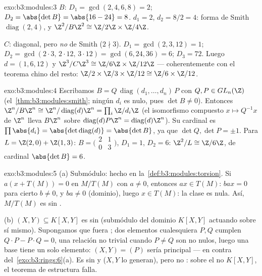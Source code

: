 \begin{solution}{exo:b3:modules:3}
$B$: $D_1 = \gcd(2,4,6,8) = 2$; $D_2 = \abs{\det B} = \abs{16 -
24} = 8$.  $d_1 = 2$,
$d_2 = 8/2 = 4$: forma de Smith $\operatorname{diag}(2, 4)$, y
$\Z^2/B\Z^2 \cong \Z/2\Z
\times \Z/4\Z$.

$C$: diagonal, pero \emph{no} de Smith ($2 \nmid 3$). $D_1 =
\gcd(2,3,12) = 1$; $D_2 = \gcd(2\cdot3,\, 2\cdot12,\, 3\cdot12) =
\gcd(6, 24, 36) = 6$; $D_3 = 72$. Luego $d = (1, 6, 12)$ y
$\Z^3/C\Z^3 \cong \Z/6\Z\times\Z/12\Z$ --- coherentemente con el teorema
chino del resto: $\Z/2\times\Z/3\times\Z/12 \cong \Z/6\times\Z/12$.
\end{solution}

\begin{solution}{exo:b3:modules:4}
Escribamos $B = Q\,\operatorname{diag}(d_1, \dots, d_n)\,P$ con $Q, P
\in GL_n(\Z)$ (el~\cref{thm:b3:modules:smith}; ningún $d_i$ es nulo,
pues $\det B \neq 0$). Entonces $\Z^n/B\Z^n \cong \Z^n/
\operatorname{diag}(d)\Z^n = \prod_i \Z/d_i\Z$ (el isomorfismo compuesto
$x \mapsto Q^{-1}x$ de $\Z^n$ lleva $B\Z^n$ sobre
$\operatorname{diag}(d)P\Z^n = \operatorname{diag}(d)\Z^n$). Su cardinal
es $\prod \abs{d_i} = \abs{\det
\operatorname{diag}(d)} = \abs{\det B}$, ya que $\det Q, \det P = \pm
1$. Para $L = \Z(2,0) + \Z(1,3)$: $B = \bigl(\begin{smallmatrix}2
& 1\\ 0 & 3\end{smallmatrix}\bigr)$, $D_1 = 1$, $D_2 = 6$: $\Z^2/L
\cong \Z/6\Z$, de cardinal $\abs{\det B} = 6$.
\end{solution}

\begin{solution}{exo:b3:modules:5}
(a) Submódulo: hecho en la~\cref{def:b3:modules:torsion}. Si $a(x +
T(M)) = 0$ en $M/T(M)$ con $a \neq 0$, entonces $ax \in T(M)$: $bax
= 0$ para cierto $b \neq 0$, y $ba \neq 0$ (dominio), luego $x \in
T(M)$: la clase es nula. Así, $M/T(M)$ es
sin .

(b) $(X, Y) \subseteq K[X,Y]$ es sin
 (submódulo del dominio $K[X,Y]$ actuando sobre sí mismo).
Supongamos que fuera ; dos elementos
cualesquiera $P, Q$ cumplen $Q\cdot P - P \cdot Q = 0$, una relación no
trivial cuando $P \ne Q$ son no nulos, luego una base tiene un solo
elemento: $(X, Y) = (P)$ sería principal --- en contra
del~\cref{exo:b3:rings:6}(a). Es sin
 y  ($X, Y$ lo
generan), pero no : sobre el
no  $K[X,Y]$, el teorema de estructura
falla.
\end{solution}

